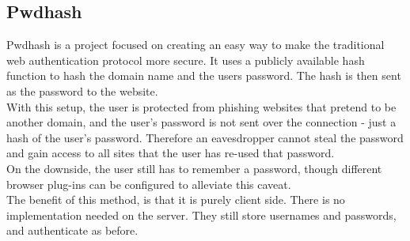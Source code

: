 \documentclass[11pt]{article}
\begin{document}
\subsection{Pwdhash}  \label{subsec:pwdhash}
Pwdhash\cite{pwdhash} is a project focused on creating an easy way to make the traditional web authentication protocol more secure. It uses a publicly available hash function to hash the domain name and the users password. The hash is then sent as the password to the website.\\
	With this setup, the user is protected from phishing websites that pretend to be another domain, and the user’s password is not sent over the connection - just a hash of the user's password. Therefore an eavesdropper cannot steal the password and gain access to all sites that the user has re-used that password.\\
	On the downside, the user still has to remember a password, though different browser plug-ins can be configured to alleviate this caveat.\\
The benefit of this method, is that it is purely client side. There is no implementation needed on the server. They still store usernames and passwords, and authenticate as before.
\end{document}
